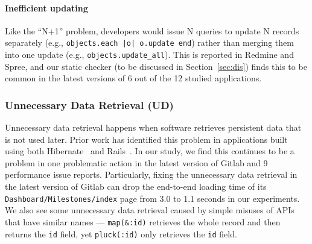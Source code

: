 
\vspace{-0.08in} 
\paragraph{\bf{Inefficient updating}}
Like the ``N+1'' problem, developers would issue N queries to update N records separately (e.g., \texttt{objects.each |o| o.update end}) rather than merging them into one update (e.g., \texttt{objects.update\_all}). This is reported in Redmine and Spree, and our static checker (to be discussed in Section~\ref{sec:dis}) finds this to be common in the latest versions of 6 out of the 12 studied applications. 
\vspace{-0.22in} 
\subsubsection{Unnecessary Data Retrieval (UD)} 
Unnecessary data retrieval happens when software retrieves persistent data that is not used later. Prior work has identified this problem in applications built using both Hibernate~\cite{chen:se16:redundantData} and Rails~\cite{yan:cikm17}. In our study, we find this continues to be a problem in one problematic action in the latest version of Gitlab and 9 performance issue reports.
Particularly, fixing the unnecessary data retrieval in the latest 
version of Gitlab can drop the end-to-end loading time of its 
\texttt{Dashboard/Milestones/index} page from 3.0 to 1.1 seconds in our experiments.
We also see some unnecessary data retrieval caused by simple misuses
of APIs that have similar names --- \texttt{map(\&:id)} retrieves the whole
record and then returns the \texttt{id} field, yet \texttt{pluck(:id)} only
retrieves the \texttt{id} field. 
\vspace{-0.08in} 
